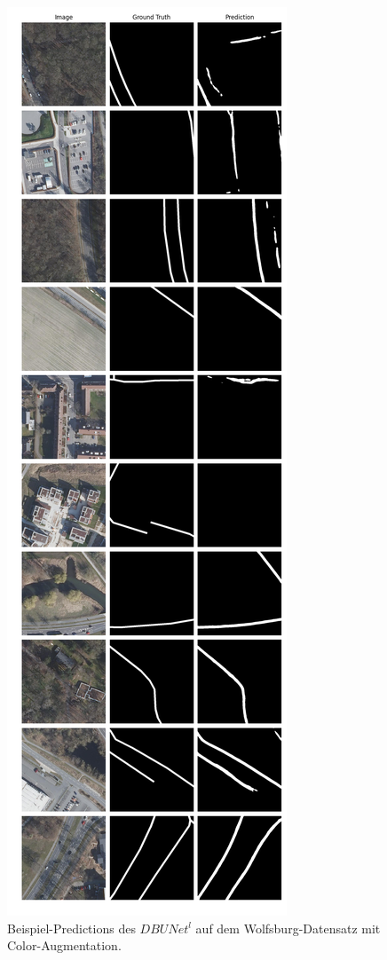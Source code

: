 \begin{figure}
	\centering
	\includegraphics[width=.41\textwidth]{Bilder/wolfsburg-color-samples/dbunet-l.png}
	\caption{Beispiel-Predictions des $DBUNet^l$ auf dem Wolfsburg-Datensatz mit Color-Augmentation.}
	\label{fig:wolfsburg-color-samples-dbunet-l}
\end{figure}

